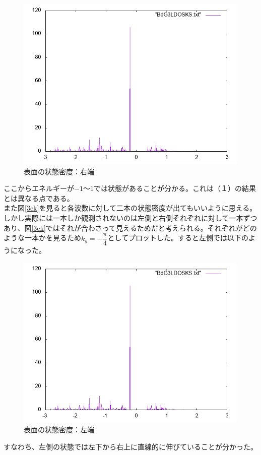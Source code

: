 \documentclass{jarticle}
\begin{document}
\begin{figure}[H]
	\centering
	\includegraphics[scale=0.7]{BdG3KSLDOSedge2.png}
	\caption{表面の状態密度：右端}
\end{figure}
ここからエネルギーが$-1$〜$1$では状態があることが分かる。これは（１）の結果とは異なる点である。\\
また図\ref{3ek}を見ると各波数に対して二本の状態密度が出てもいいように思える。しかし実際には一本しか観測されないのは左側と右側それぞれに対して一本ずつあり、図\ref{3ek}ではそれが合わさって見えるためだと考えられる。それぞれがどのような一本かを見るため$k_y=-\dfrac{\pi}{4}$としてプロットした。すると左側では以下のようになった。
\begin{figure}[H]
	\centering
	\includegraphics[scale=0.7]{BdG3KSLDOSedge1-.png}
	\caption{表面の状態密度：左端}
\end{figure}
すなわち、左側の状態では左下から右上に直線的に伸びていることが分かった。
\end{document}

